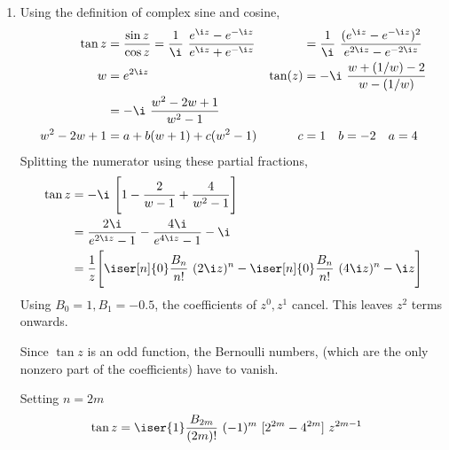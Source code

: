 \begin{enumerate}
\begin{enumerate}
              \item Using the definition of complex sine and cosine,
                    \begin{align}
                        \tan z       & = \frac{\sin z}{\cos z} = \frac{1}{\i}
                        \ \frac{e^{\i z}
                            - e^{-\i z}} {e^{\i z}
                        + e^{-\i z}} &
                                     & = \frac{1}{\i}\ \frac{(e^{\i z}
                        - e^{-\i z})^2}{e^{2\i z} - e^{-2\i z}}                 \\
                        w            & = e^{2\i z}                            &
                        \tan(z)      & = -\i\ \frac{w + (1/w) - 2}{w - (1/w)}   \\
                                     & = -\i\ \frac{w^2 - 2w + 1}{w^2 - 1}      \\
                        w^2 - 2w + 1 & = a + b(w + 1) + c(w^2 - 1)            &
                        c            & = 1 \quad b= -2 \quad a = 4
                    \end{align}
                    Splitting the numerator using these partial fractions,
                    \begin{align}
                        \tan z & = -\i\ \Bigg[1 - \frac{2}{w - 1} + \frac{4}
                        {w^2 - 1}\Bigg]                                          \\
                               & = \frac{2\i}{e^{2\i z} - 1} - \frac{4\i}
                        {e^{4\i z} - 1} - \i                                     \\
                               & = \frac{1}{z} \Bigg[ \iser[n]{0} \frac{B_n}{n!}
                            \ (2\i z)^n  - \iser[n]{0} \frac{B_n}{n!}\ (4\i z)^n
                            - \i z \Bigg]
                    \end{align}
                    Using $ B_0 = 1, B_1 = -0.5 $, the coefficients of $ z^0, z^1 $
                    cancel. This leaves $ z^2 $ terms onwards. \par
                    Since $ \tan z $ is an odd function, the Bernoulli numbers,
                    (which are the only nonzero part of the coefficients) have to vanish.
                    \par Setting $ n = 2m $
                    \begin{align}
                        \tan z & = \iser{1} \frac{B_{2m}}{(2m)!}\ (-1)^m\ [2^{2m}
                        - 4^{2m}]\ z^{2m-1}
                    \end{align}
          \end{enumerate}


\end{enumerate}
